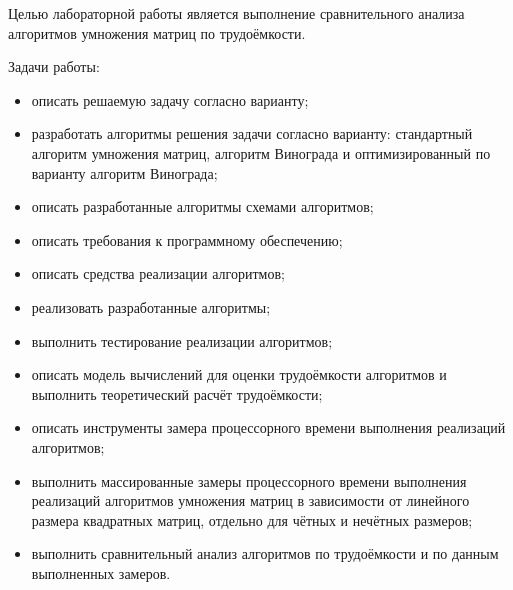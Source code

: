
Целью лабораторной работы является выполнение сравнительного анализа алгоритмов умножения матриц по трудоёмкости.

Задачи работы:
\begin{itemize}
    \item описать решаемую задачу согласно варианту;
    \item разработать алгоритмы решения задачи согласно варианту: стандартный алгоритм умножения матриц, алгоритм Винограда и оптимизированный по варианту алгоритм Винограда;
    \item описать разработанные алгоритмы схемами алгоритмов;
    \item описать требования к программному обеспечению;
    \item описать средства реализации алгоритмов;
    \item реализовать разработанные алгоритмы;
    \item выполнить тестирование реализации алгоритмов;
    \item описать модель вычислений для оценки трудоёмкости алгоритмов и выполнить теоретический расчёт трудоёмкости;
    \item описать инструменты замера процессорного времени выполнения реализаций алгоритмов;
    \item выполнить массированные замеры процессорного времени выполнения реализаций алгоритмов умножения матриц в зависимости от линейного размера квадратных матриц, отдельно для чётных и нечётных размеров;
    \item выполнить сравнительный анализ алгоритмов по трудоёмкости и по данным выполненных замеров.
\end{itemize}
